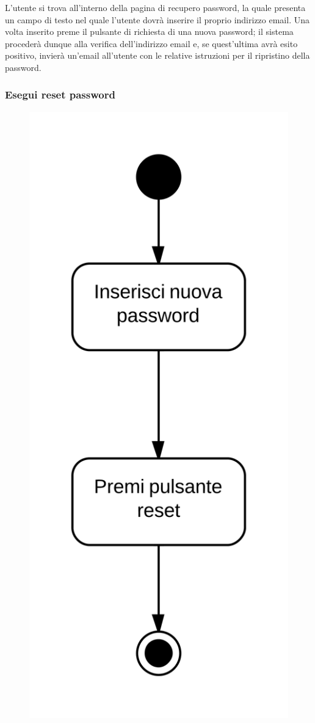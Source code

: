 L'utente si trova all'interno della pagina di recupero password, la quale presenta un campo di testo nel quale l'utente dovrà inserire il proprio indirizzo email. Una volta inserito preme il pulsante di richiesta di una nuova password; il sistema  procederà dunque alla verifica dell'indirizzo email e, se quest'ultima avrà esito positivo, invierà un'email all'utente con le relative istruzioni per il ripristino della password.

\subsubsection{Esegui reset password}

\begin{figure}[H]
\centering
\includegraphics[scale=0.05]{uml/MaaP - Esegui reset password.png}

\end{figure}
